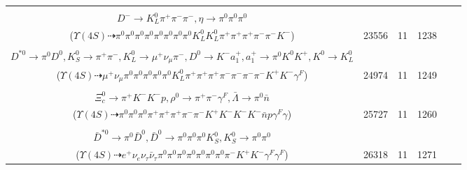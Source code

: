 \documentclass[landscape]{article}
\newcounter{rownumbers}
\newcommand\rn{\stepcounter{rownumbers}\arabic{rownumbers}}
\newcommand{\EOLP}{\\ \hline} %
\newcommand{\topoTags}[1]{#1} %
\begin{document}
\begin{longtable}{clcccc}
\rn & \makecell[l]{ $ 
\Upsilon(4S) \rightarrow B^{0} \bar{B}^{0} ,
B^{0} \rightarrow D_{2}^{*-} D_{s}^{+} ,
\bar{B}^{0} \rightarrow K^{-} D^{+} ,
D_{2}^{*-} \rightarrow \pi^{0} D^{-} ,
D_{s}^{+} \rightarrow \pi^{0} \pi^{0} \pi^{0} \pi^{0} \pi^{+} \eta ,
D^{+} \rightarrow K_{L}^{0} \pi^{+} ,
$ \\ $
D^{-} \rightarrow K_{L}^{0} \pi^{+} \pi^{-} \pi^{-} ,
\eta \rightarrow \pi^{0} \pi^{0} \pi^{0} 
$ \\ ($
\Upsilon(4S) \dashrightarrow \pi^{0} \pi^{0} \pi^{0} \pi^{0} \pi^{0} \pi^{0} \pi^{0} \pi^{0} K_{L}^{0} K_{L}^{0} \pi^{+} \pi^{+} \pi^{+} \pi^{-} \pi^{-} K^{-} 
$) } & \topoTags{23556 & }11 & 1238 \EOLP

\rn & \makecell[l]{ $ 
\Upsilon(4S) \rightarrow B^{0} \bar{B}^{0} ,
B^{0} \rightarrow \pi^{0} \pi^{+} \pi^{-} \gamma^{F} ,
\bar{B}^{0} \rightarrow \pi^{0} \omega K^{0} \bar{K}^{0} D^{*0} ,
\omega \rightarrow \pi^{0} \pi^{+} \pi^{-} ,
K^{0} \rightarrow K_{S}^{0} ,
\bar{K}^{0} \rightarrow K_{L}^{0} ,
$ \\ $
D^{*0} \rightarrow \pi^{0} D^{0} ,
K_{S}^{0} \rightarrow \pi^{+} \pi^{-} ,
K_{L}^{0} \rightarrow \mu^{+} \nu_{\mu} \pi^{-} ,
D^{0} \rightarrow K^{-} a_{1}^{+} ,
a_{1}^{+} \rightarrow \pi^{0} K^{0} K^{+} ,
K^{0} \rightarrow K_{L}^{0} 
$ \\ ($
\Upsilon(4S) \dashrightarrow \mu^{+} \nu_{\mu} \pi^{0} \pi^{0} \pi^{0} \pi^{0} \pi^{0} K_{L}^{0} \pi^{+} \pi^{+} \pi^{+} \pi^{-} \pi^{-} \pi^{-} \pi^{-} K^{+} K^{-} \gamma^{F} 
$) } & \topoTags{24974 & }11 & 1249 \EOLP

\rn & \makecell[l]{ $ 
\Upsilon(4S) \rightarrow B^{0} \bar{B}^{0} ,
B^{0} \rightarrow K^{+} a_{1}^{-} ,
\bar{B}^{0} \rightarrow \pi^{0} \omega K^{-} \bar{\Xi}^{+} \Xi_{c}^{0} ,
a_{1}^{-} \rightarrow \rho^{0} \pi^{-} ,
\omega \rightarrow \pi^{0} \gamma ,
\bar{\Xi}^{+} \rightarrow \pi^{+} \bar{\Lambda} ,
$ \\ $
\Xi_{c}^{0} \rightarrow \pi^{+} K^{-} K^{-} p ,
\rho^{0} \rightarrow \pi^{+} \pi^{-} \gamma^{F} ,
\bar{\Lambda} \rightarrow \pi^{0} \bar{n} 
$ \\ ($
\Upsilon(4S) \dashrightarrow \pi^{0} \pi^{0} \pi^{0} \pi^{+} \pi^{+} \pi^{+} \pi^{-} \pi^{-} K^{+} K^{-} K^{-} K^{-} \bar{n} p \gamma^{F} \gamma 
$) } & \topoTags{25727 & }11 & 1260 \EOLP

\rn & \makecell[l]{ $ 
\Upsilon(4S) \rightarrow B^{0} \bar{B}^{0} ,
B^{0} \rightarrow \tau^{+} \nu_{\tau} D_{1}^{\prime-} ,
\bar{B}^{0} \rightarrow K^{+} K^{*-} ,
\tau^{+} \rightarrow e^{+} \nu_{e} \bar{\nu}_{\tau} \gamma^{F} \gamma^{F} ,
D_{1}^{\prime-} \rightarrow \pi^{-} \bar{D}^{*0} ,
K^{*-} \rightarrow \pi^{0} K^{-} ,
$ \\ $
\bar{D}^{*0} \rightarrow \pi^{0} \bar{D}^{0} ,
\bar{D}^{0} \rightarrow \pi^{0} \pi^{0} \pi^{0} K_{S}^{0} ,
K_{S}^{0} \rightarrow \pi^{0} \pi^{0} 
$ \\ ($
\Upsilon(4S) \dashrightarrow e^{+} \nu_{e} \nu_{\tau} \bar{\nu}_{\tau} \pi^{0} \pi^{0} \pi^{0} \pi^{0} \pi^{0} \pi^{0} \pi^{0} \pi^{-} K^{+} K^{-} \gamma^{F} \gamma^{F} 
$) } & \topoTags{26318 & }11 & 1271 \EOLP


\end{longtable}
\end{document}
